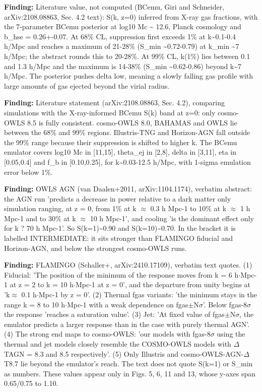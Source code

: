\documentclass[11pt,a4paper]{article}
\begin{document}
\textbf{Finding:} Literature value, not computed (BCemu, Giri and Schneider, arXiv:2108.08863, Sec. 4.2 text): S(k, z=0) inferred from X-ray gas fractions, with the 7-parameter BCemu posterior at log10 Mc \textasciitilde{} 12.6, Planck cosmology and b\_hse = 0.26+-0.07. At 68\% CL, suppression first exceeds 1\% at k\textasciitilde{}0.1-0.4 h/Mpc and reaches a maximum of 21-28\% (S\_min \textasciitilde{}0.72-0.79) at k\_min \textasciitilde{}7 h/Mpc; the abstract rounds this to 20-28\%. At 99\% CL, k(1\%) lies between 0.1 and 1.3 h/Mpc and the maximum is 14-38\% (S\_min \textasciitilde{}0.62-0.86) beyond k\textasciitilde{}7 h/Mpc. The posterior pushes delta low, meaning a slowly falling gas profile with large amounts of gas ejected beyond the virial radius.

\textbf{Finding:} Literature statement (arXiv:2108.08863, Sec. 4.2), comparing simulations with the X-ray-informed BCemu S(k) band at z=0: only cosmo-OWLS 8.5 is fully consistent. cosmo-OWLS 8.0, BAHAMAS and OWLS lie between the 68\% and 99\% regions. Illustris-TNG and Horizon-AGN fall outside the 99\% range because their suppression is shifted to higher k. The BCemu emulator covers log10 Mc in [11,15], theta\_ej in [2,8], delta in [3,11], eta in [0.05,0.4] and f\_b in [0.10,0.25], for k\textasciitilde{}0.03-12.5 h/Mpc, with 1-sigma emulation error below 1\%.

\textbf{Finding:} OWLS AGN (van Daalen+2011, arXiv:1104.1174), verbatim abstract: the AGN run 'predicts a decrease in power relative to a dark matter only simulation ranging, at z = 0, from 1\% at k $\approx$ 0.3 h Mpc-1 to 10\% at k $\approx$ 1 h Mpc-1 and to 30\% at k $\approx$ 10 h Mpc-1', and cooling 'is the dominant effect only for k ? 70 h Mpc-1'. So S(k=1)\textasciitilde{}0.90 and S(k=10)\textasciitilde{}0.70. In the bracket it is labelled INTERMEDIATE: it sits stronger than FLAMINGO fiducial and Horizon-AGN, and below the strongest cosmo-OWLS runs.

\textbf{Finding:} FLAMINGO (Schaller+, arXiv:2410.17109), verbatim text quotes. (1) Fiducial: 'The position of the minimum of the response moves from k = 6 h$\cdot$Mpc-1 at z = 2 to k = 10 h$\cdot$Mpc-1 at z = 0', and the departure from unity begins at 'k$\approx$ 0.1 h$\cdot$Mpc-1 by z = 0'. (2) Thermal fgas variants: 'the minimum stays in the range k = 8 to 10 h$\cdot$Mpc-1 with a weak dependence on fgas$\pm$N$\sigma$'. Below fgas-8$\sigma$ the response 'reaches a saturation value'. (3) Jet: 'At fixed value of fgas$\pm$N$\sigma$, the emulator predicts a larger response than in the case with purely thermal AGN'. (4) The strong end maps to cosmo-OWLS: 'our models with fgas-8$\sigma$ using the thermal and jet models closely resemble the COSMO-OWLS models with $\Delta$TAGN = 8.3 and 8.5 respectively'. (5) Only Illustris and cosmo-OWLS-AGN-$\Delta$T8.7 lie beyond the emulator's reach. The text does not quote S(k=1) or S\_min as numbers. These values appear only in Figs. 5, 6, 11 and 13, whose y-axes span 0.65/0.75 to 1.10.
\end{document}
